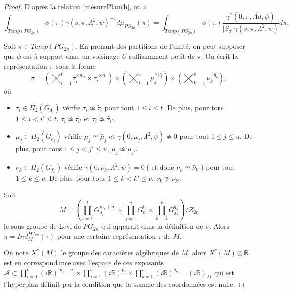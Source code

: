 \documentclass{amsart}
\begin{document}
\begin{proof}
D'après la relation \ref{mesurePlanch}, on a
\begin{equation}
\int_{Temp(PG_{2n})} \phi(\pi) \gamma(s, \pi, \Lambda^2, \psi)^{-1} d\mu_{PG_{2n}}(\pi) = 
\int_{Temp(PG_{2n})} \phi(\pi) \frac{\gamma^*(0, \pi, \overline{Ad}, \psi)}{|S_\pi|\gamma(s, \pi, \Lambda^2, \psi)} d\pi.
\end{equation}

Soit $\pi \in Temp(PG_{2n})$. En prenant des partitions de l'unité, on peut supposer que $\phi$ est à support dans un voisinage $U$ suffisamment petit de $\pi$. On écrit la représentation $\pi$ sous la forme
\begin{equation}
\pi = \left( \bigtimes_{i=1}^t \tau_i^{\times m_i} \times \widetilde{\tau_i}^{\times n_i} \right) \times \left( \bigtimes_{j=1}^u \mu_j^{\times p_j} \right) \times \left( \bigtimes_{k=1}^v \nu_k^{\times q_k}\right),
\end{equation}
où
\begin{itemize}
\item $\tau_i \in \Pi_2(G_{d_i})$ vérifie $\tau_i \not \simeq \widetilde{\tau_i}$ pour tout $1\leq i \leq t$. De plus, pour tous $1 \leq i < i' \leq t$, $\tau_i \not \simeq \tau_{i'}$ et $\tau_i \not \simeq \widetilde{\tau_{i'}}$.
\item $\mu_j \in \Pi_2(G_{e_j})$ vérifie $\mu_j \simeq \widetilde{\mu_j}$ et $\gamma(0, \mu_j, \Lambda^2, \psi) \neq 0$ pour tout $1\leq j \leq u$. De plus, pour tous $1 \leq j < j' \leq u$, $\mu_j \not \simeq \mu_{j'}$.
\item $\nu_k \in \Pi_2(G_{f_k})$ vérifie $\gamma(0, \nu_k, \Lambda^2, \psi) = 0$ ( et donc $\nu_k \simeq \widetilde{\nu_k}$ ) pour tout $1\leq k \leq v$. De plus, pour tous $1 \leq k < k' \leq v$, $\nu_k \not \simeq \nu_{k'}$.
\end{itemize}

Soit
\begin{equation}
M = \left( \prod_{i=1}^t G_{d_i}^{m_i+n_i} \times \prod_{j=1}^u G_{e_j}^{p_j} \times \prod_{k=1}^v G_{f_k}^{q_k} \right) / Z_{2n}
\end{equation}
le sous-groupe de Levi de $PG_{2n}$ qui apparait dans la définition de $\pi$. Alors $\pi = Ind_M^{PG_{2n}}(\tau)$ pour une certaine représentation $\tau$ de $M$.

On note $X^*(M)$ le groupe des caractères algébriques de $M$, alors $X^*(M) \otimes \mathbb{R}$ est en correspondance avec l'espace de ces exposants 
$\mathcal{A} \subset \prod_{i=1}^t (i\mathbb{R})^{m_i+n_i} \times \prod_{j=1}^u (i\mathbb{R})^{p_j} \times \prod_{k=1}^v (i\mathbb{R})^{q_k} = (i\mathbb{R})_M$ qui est l'hyperplan définit par la condition que la somme des coordonnées est nulle.


\end{proof}
\end{document}
